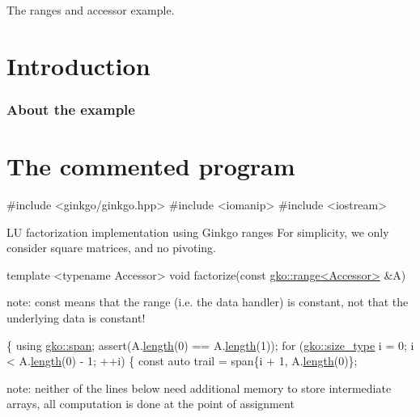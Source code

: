 The ranges and accessor example.

 \label{_Intro}%
 \label{_Introduction}%
\section*{Introduction}

\label{_Abouttheexample}%
\subsubsection*{About the example }

\label{_CommProg}%
 \section*{The commented program}


\begin{DoxyCode}
\textcolor{preprocessor}{#include <ginkgo/ginkgo.hpp>}
\textcolor{preprocessor}{#include <iomanip>}
\textcolor{preprocessor}{#include <iostream>}
\end{DoxyCode}


LU factorization implementation using Ginkgo ranges For simplicity, we only consider square matrices, and no pivoting.


\begin{DoxyCode}
\textcolor{keyword}{template} <\textcolor{keyword}{typename} Accessor>
\textcolor{keywordtype}{void} factorize(\textcolor{keyword}{const} \hyperlink{classgko_1_1range}{gko::range<Accessor>} &A)
\end{DoxyCode}


note\+: const means that the range (i.\+e. the data handler) is constant, not that the underlying data is constant!


\begin{DoxyCode}
\{
    \textcolor{keyword}{using} \hyperlink{structgko_1_1span}{gko::span};
    assert(A.\hyperlink{classgko_1_1range_a3ac8b238c377da9cc05d7c728efabfc8}{length}(0) == A.\hyperlink{classgko_1_1range_a3ac8b238c377da9cc05d7c728efabfc8}{length}(1));
    \textcolor{keywordflow}{for} (\hyperlink{namespacegko_a6e5c95df0ae4e47aab2f604a22d98ee7}{gko::size\_type} i = 0; i < A.\hyperlink{classgko_1_1range_a3ac8b238c377da9cc05d7c728efabfc8}{length}(0) - 1; ++i) \{
        \textcolor{keyword}{const} \textcolor{keyword}{auto} trail = span\{i + 1, A.\hyperlink{classgko_1_1range_a3ac8b238c377da9cc05d7c728efabfc8}{length}(0)\};
\end{DoxyCode}


note\+: neither of the lines below need additional memory to store intermediate arrays, all computation is done at the point of assignment


